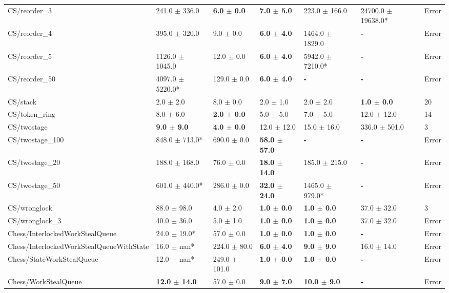 \begin{table}
\begin{spacing}{1.5}
\begin{tabular}{lllllll}
CS/reorder\_3 & 241.0 $\pm$ 336.0 & \textbf{ 6.0 $\pm$ 0.0 } & \textbf{ 7.0 $\pm$ 5.0 } & 223.0 $\pm$ 166.0 & 24700.0 $\pm$ 19638.0* & Error \\
CS/reorder\_4 & 395.0 $\pm$ 320.0 & 9.0 $\pm$ 0.0 & \textbf{ 6.0 $\pm$ 4.0 } & 1464.0 $\pm$ 1829.0 & \textbf{ - } & Error \\
CS/reorder\_5 & 1126.0 $\pm$ 1045.0 & 12.0 $\pm$ 0.0 & \textbf{ 6.0 $\pm$ 4.0 } & 5942.0 $\pm$ 7210.0* & \textbf{ - } & Error \\
CS/reorder\_50 & 4097.0 $\pm$ 5220.0* & 129.0 $\pm$ 0.0 & \textbf{ 6.0 $\pm$ 4.0 } & \textbf{ - } & \textbf{ - } & Error \\
CS/stack & 2.0 $\pm$ 2.0 & 8.0 $\pm$ 0.0 & 2.0 $\pm$ 1.0 & 2.0 $\pm$ 2.0 & \textbf{ 1.0 $\pm$ 0.0 } & 20 \\
CS/token\_ring & 8.0 $\pm$ 6.0 & \textbf{ 2.0 $\pm$ 0.0 } & 5.0 $\pm$ 5.0 & 7.0 $\pm$ 5.0 & 12.0 $\pm$ 12.0 & 14 \\
CS/twostage & \textbf{ 9.0 $\pm$ 9.0 } & \textbf{ 4.0 $\pm$ 0.0 } & 12.0 $\pm$ 12.0 & 15.0 $\pm$ 16.0 & 336.0 $\pm$ 501.0 &  3  \\
CS/twostage\_100 & 848.0 $\pm$ 713.0* & 690.0 $\pm$ 0.0 & \textbf{ 58.0 $\pm$ 57.0 } & \textbf{ - } & \textbf{ - } & Error \\
CS/twostage\_20 & 188.0 $\pm$ 168.0 & 76.0 $\pm$ 0.0 & \textbf{ 18.0 $\pm$ 14.0 } & 185.0 $\pm$ 215.0 & \textbf{ - } & Error \\
CS/twostage\_50 & 601.0 $\pm$ 440.0* & 286.0 $\pm$ 0.0 & \textbf{ 32.0 $\pm$ 24.0 } & 1465.0 $\pm$ 979.0* & \textbf{ - } & Error \\
CS/wronglock & 88.0 $\pm$ 98.0 & 4.0 $\pm$ 2.0 & \textbf{ 1.0 $\pm$ 0.0 } & \textbf{ 1.0 $\pm$ 0.0 } & 37.0 $\pm$ 32.0 & 3 \\
CS/wronglock\_3 & 40.0 $\pm$ 36.0 & 5.0 $\pm$ 1.0 & \textbf{ 1.0 $\pm$ 0.0 } & \textbf{ 1.0 $\pm$ 0.0 } & 37.0 $\pm$ 32.0 & Error \\
Chess/InterlockedWorkStealQueue & 24.0 $\pm$ 19.0* & 57.0 $\pm$ 0.0 & \textbf{ 1.0 $\pm$ 0.0 } & \textbf{ 1.0 $\pm$ 0.0 } & \textbf{ - } & Error \\
Chess/InterlockedWorkStealQueueWithState & 16.0 $\pm$ nan* & 224.0 $\pm$ 80.0 & \textbf{ 6.0 $\pm$ 4.0 } & \textbf{ 9.0 $\pm$ 9.0 } & 16.0 $\pm$ 14.0 & Error \\
Chess/StateWorkStealQueue & 12.0 $\pm$ nan* & 249.0 $\pm$ 101.0 & \textbf{ 1.0 $\pm$ 0.0 } & \textbf{ 1.0 $\pm$ 0.0 } & \textbf{ - } & Error \\
Chess/WorkStealQueue & \textbf{ 12.0 $\pm$ 14.0 } & 57.0 $\pm$ 0.0 & \textbf{ 9.0 $\pm$ 7.0 } & \textbf{ 10.0 $\pm$ 9.0 } & \textbf{ - } & Error \\

\end{tabular}
\end{spacing}
\end{table}
